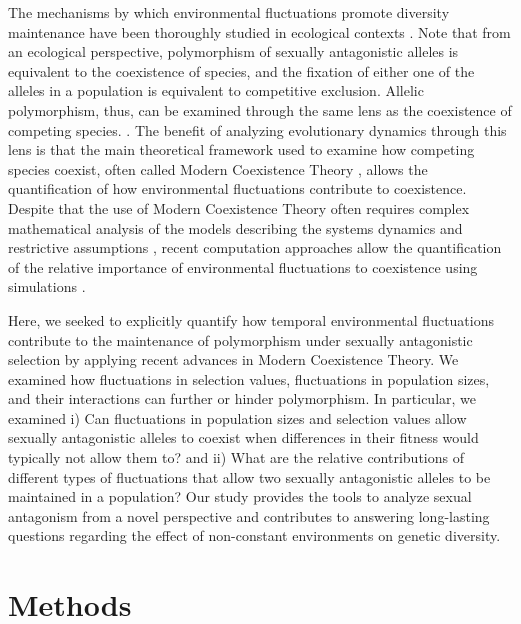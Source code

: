 \documentclass[12pt]{article}
\begin{document}
The mechanisms by which environmental fluctuations promote diversity maintenance have been thoroughly  studied in ecological contexts \citep{levins1979coexistence,armstrong1980competitive,chesson2000general,barabas_chessons_2018}. Note that from an ecological perspective, polymorphism of sexually antagonistic alleles is equivalent to the coexistence of species, and the fixation of either one of the alleles in a population is equivalent to competitive exclusion. Allelic polymorphism, thus, can be examined through the same lens as the coexistence of competing species. \citep{ellner1994role,ellner1996patterns,dean2005protecting,schreiber2010interactive}. The benefit of analyzing evolutionary dynamics through this lens is that the main theoretical framework used to examine how competing species coexist, often called Modern Coexistence Theory \citep{Chesson2000, barabas_chessons_2018}, allows the quantification of how environmental fluctuations contribute to coexistence. Despite that the use of Modern Coexistence Theory often requires complex mathematical analysis of the models describing the systems dynamics and restrictive assumptions \citep{barabas_chessons_2018}, recent computation approaches allow the quantification of the relative importance of environmental fluctuations to coexistence using simulations \citep{ellner2016quantify,ellner_expanded_2019,shoemaker2020}.

Here, we seeked to explicitly quantify how temporal environmental fluctuations contribute to the maintenance of polymorphism under sexually antagonistic selection by applying recent advances in Modern Coexistence Theory.  We examined how fluctuations in selection values, fluctuations in population sizes, and their interactions can further or hinder polymorphism. In particular, we examined i) Can fluctuations in population sizes and selection values allow sexually antagonistic alleles to coexist when differences in their fitness would typically not allow them to? and ii) What are the relative contributions of different types of fluctuations that allow two sexually antagonistic alleles to be maintained in a population? Our study provides the tools to analyze sexual antagonism from a novel perspective and contributes to answering long-lasting questions regarding the effect of non-constant environments on genetic diversity.


\section{Methods}
\end{document}
